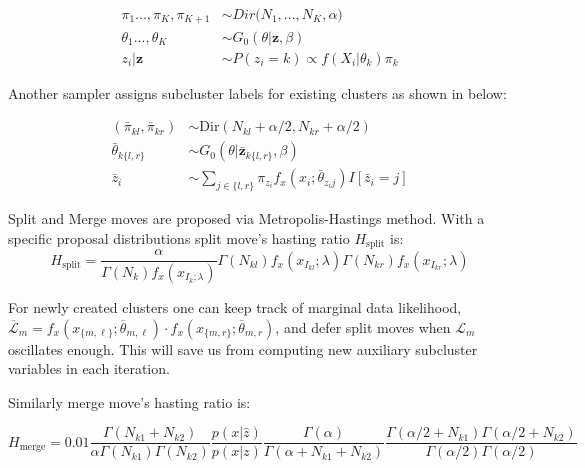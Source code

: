 \documentclass[12pt, a4paper]{article}
\begin{document}
\begin{align}
\pi_1...,\pi_K, \pi_{K+1} &\sim Dir\big(N_1,...,N_K, \alpha \big) \label{ds:one} \\ 
\theta_1...,\theta_K&\sim G_0(\theta|\boldsymbol z, \beta) \\
z_i|\boldsymbol z &\sim P(z_i=k) \propto f(X_i|\theta_{k})\pi_k \label{ds:three}
\end{align}\label{eq:directsamplernonergodic}

Another sampler assigns subcluster labels for existing clusters as shown in below:

\begin{align}
(\bar{\pi}_{kl}, \bar{\pi}_{kr}) &\sim \mathrm{Dir}(N_{kl}+\alpha/2, N_{kr}+\alpha/2) \label{eq:one1} \\
\bar{\theta}_{k\{l,r\}} &\sim G_0(\theta|\bar{\boldsymbol z}_{k\{l,r\}}, \beta)  \\
\bar{z}_{i} &\sim \sum_{j \in \{l,r\}} \pi_{z_{i}}f_x(x_i;\bar{\theta}_{z_{i}j})I[\bar{z}_{i} = j]\label{e1:two2}
\end{align}

Split and Merge moves are proposed via Metropolis-Hastings method. With a specific proposal distributions split move's hasting ratio $H_{\text {split}}$ is:
$$
H_{\text {split}} = \frac{\alpha}{\Gamma\left(N_{k}\right) f_{x}\left(x_{I_{k} ; \lambda}\right)} \Gamma\left(N_{k l}\right) f_{x}\left(x_{I_{k l}} ; \lambda\right) \Gamma\left(N_{k r}\right) f_{x}\left(x_{I_{k r}} ; \lambda\right)
$$

For newly created clusters one can keep track of marginal data likelihood, $\overline{\mathcal{L}}_{m}=f_{x}\left(x_{\{m, \ell\}} ; \overline{\theta}_{m, \ell}\right) \cdot f_{x}\left(x_{\{m, r\}} ; \overline{\theta}_{m, r}\right)$, and defer split moves when $\mathcal{L}_{m}$ oscillates enough. This will save us from computing new auxiliary subcluster variables in each iteration.

Similarly merge move's hasting ratio is:

$$
H_{\text {merge}}=0.01 \frac{\Gamma\left(N_{k 1}+N_{k 2}\right)}{\alpha \Gamma\left(N_{k 1}\right) \Gamma\left(N_{k 2}\right)} \frac{p(x | \hat{z})}{p(x | z)} \frac{\Gamma(\alpha)}{\Gamma\left(\alpha+N_{k 1}+N_{k 2}\right)} \frac{\Gamma\left(\alpha / 2+N_{k 1}\right) \Gamma\left(\alpha / 2+N_{k 2}\right)}{\Gamma(\alpha / 2) \Gamma(\alpha / 2)}
$$
\end{document}

